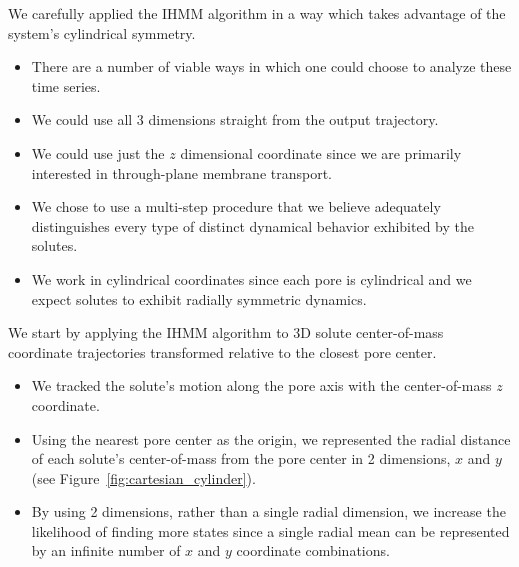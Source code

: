 \documentclass{article}
\begin{document}
  We carefully applied the IHMM algorithm in a way which takes advantage of the
  system's cylindrical symmetry.
  \begin{itemize}
    \item There are a number of viable ways in which one could choose to analyze 
    these time series.
    \item We could use all 3 dimensions straight from the output trajectory.
    \item We could use just the $z$ dimensional coordinate since we are primarily
    interested in through-plane membrane transport.
    \item We chose to use a multi-step procedure that we believe adequately
    distinguishes every type of distinct dynamical behavior exhibited by 
    the solutes.
    \item We work in cylindrical coordinates since each pore is cylindrical
    and we expect solutes to exhibit radially symmetric dynamics.
  \end{itemize}  
  
  We start by applying the IHMM algorithm to 3D solute center-of-mass coordinate 
  trajectories transformed relative to the closest pore center.
  \begin{itemize}
    \item We tracked the solute's motion along the pore axis with the center-of-mass
    $z$ coordinate.
    \item Using the nearest pore center as the origin, we represented the radial 
    distance of each solute's center-of-mass from the pore center in 2 dimensions,
    $x$ and $y$ (see Figure~\ref{fig:cartesian_cylinder}).
    \item By using 2 dimensions, rather than a single radial dimension, we
    increase the likelihood of finding more states since a single radial
    mean can be represented by an infinite number of $x$ and $y$ coordinate combinations.
  \end{itemize}
  
\end{document}
